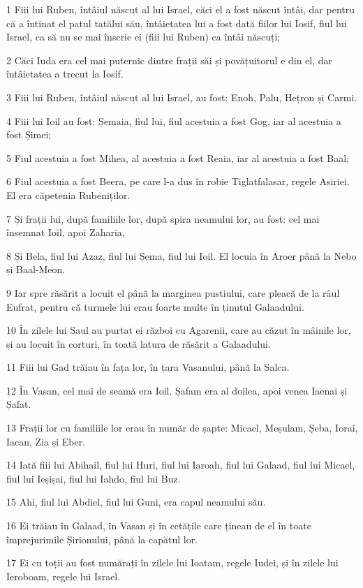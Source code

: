 \par 1 Fiii lui Ruben, întâiul născut al lui Israel, căci el a fost născut întâi, dar pentru că a întinat el patul tatălui său, întâietatea lui a fost dată fiilor lui Iosif, fiul lui Israel, ca să nu se mai înscrie ei (fiii lui Ruben) ca întâi născuți;
\par 2 Căci Iuda era cel mai puternic dintre frații săi și povățuitorul e din el, dar întâietatea a trecut la Iosif.
\par 3 Fiii lui Ruben, întâiul născut al lui Israel, au fost: Enoh, Palu, Hețron și Carmi.
\par 4 Fiii lui Ioil au fost: Șemaia, fiul lui, fiul acestuia a fost Gog, iar al acestuia a fost Șimei;
\par 5 Fiul acestuia a fost Mihea, al acestuia a fost Reaia, iar al acestuia a fost Baal;
\par 6 Fiul acestuia a fost Beera, pe care l-a dus în robie Tiglatfalasar, regele Asiriei. El era căpetenia Rubeniților.
\par 7 Și frații lui, după familiile lor, după spira neamului lor, au fost: cel mai însemnat Ioil, apoi Zaharia,
\par 8 Și Bela, fiul lui Azaz, fiul lui Șema, fiul lui Ioil. El locuia în Aroer până la Nebo și Baal-Meon.
\par 9 Iar spre răsărit a locuit el până la marginea pustiului, care pleacă de la râul Eufrat, pentru că turmele lui erau foarte multe în ținutul Galaadului.
\par 10 În zilele lui Saul au purtat ei război cu Agarenii, care au căzut în mâinile lor, și au locuit în corturi, în toată latura de răsărit a Galaadului.
\par 11 Fiii lui Gad trăiau în fața lor, în țara Vasanului, până la Salca.
\par 12 În Vasan, cel mai de seamă era Ioil. Șafam era al doilea, apoi venea Iaenai și Șafat.
\par 13 Frații lor cu familiile lor erau în număr de șapte: Micael, Meșulam, Șeba, Iorai, Iacan, Zia și Eber.
\par 14 Iată fiii lui Abihail, fiul lui Huri, fiul lui Iaroah, fiul lui Galaad, fiul lui Micael, fiul lui Ieșișai, fiul lui Iahdo, fiul lui Buz.
\par 15 Ahi, fiul lui Abdiel, fiul lui Guni, era capul neamului său.
\par 16 Ei trăiau în Galaad, în Vasan și în cetățile care țineau de el în toate împrejurimile Șirionului, până la capătul lor.
\par 17 Ei cu toții au fost numărați în zilele lui Ioatam, regele Iudei, și în zilele lui Ieroboam, regele lui Israel.
